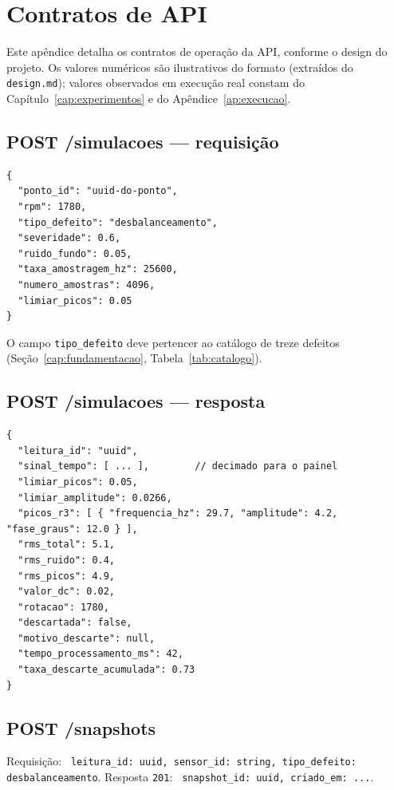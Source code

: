 \chapter{Contratos de API}
\label{ap:contratos}

Este apêndice detalha os contratos de operação da API, conforme o design do
projeto. Os valores numéricos são ilustrativos do formato (extraídos do
\texttt{design.md}); valores observados em execução real constam do
Capítulo~\ref{cap:experimentos} e do Apêndice~\ref{ap:execucao}.

\section{POST /simulacoes --- requisição}

\begin{verbatim}
{
  "ponto_id": "uuid-do-ponto",
  "rpm": 1780,
  "tipo_defeito": "desbalanceamento",
  "severidade": 0.6,
  "ruido_fundo": 0.05,
  "taxa_amostragem_hz": 25600,
  "numero_amostras": 4096,
  "limiar_picos": 0.05
}
\end{verbatim}


O campo \texttt{tipo\_defeito} deve pertencer ao catálogo de treze defeitos
(Seção~\ref{cap:fundamentacao}, Tabela~\ref{tab:catalogo}).

\section{POST /simulacoes --- resposta}

\begin{verbatim}
{
  "leitura_id": "uuid",
  "sinal_tempo": [ ... ],        // decimado para o painel
  "limiar_picos": 0.05,
  "limiar_amplitude": 0.0266,
  "picos_r3": [ { "frequencia_hz": 29.7, "amplitude": 4.2, "fase_graus": 12.0 } ],
  "rms_total": 5.1,
  "rms_ruido": 0.4,
  "rms_picos": 4.9,
  "valor_dc": 0.02,
  "rotacao": 1780,
  "descartada": false,
  "motivo_descarte": null,
  "tempo_processamento_ms": 42,
  "taxa_descarte_acumulada": 0.73
}
\end{verbatim}


\section{POST /snapshots}

Requisição: \texttt{{ \textquotedbl leitura\_id\textquotedbl : \textquotedbl uuid\textquotedbl , \textquotedbl sensor\_id\textquotedbl : \textquotedbl string\textquotedbl , \textquotedbl tipo\_defeito\textquotedbl :
\textquotedbl desbalanceamento\textquotedbl  }}. Resposta \texttt{201}: \texttt{{ \textquotedbl snapshot\_id\textquotedbl : \textquotedbl uuid\textquotedbl , \textquotedbl criado\_em\textquotedbl :
\textquotedbl ...\textquotedbl  }}.

